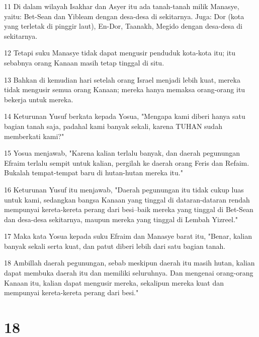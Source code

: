 \par 11 Di dalam wilayah Isakhar dan Asyer itu ada tanah-tanah milik Manasye, yaitu: Bet-Sean dan Yibleam dengan desa-desa di sekitarnya. Juga: Dor (kota yang terletak di pinggir laut), En-Dor, Taanakh, Megido dengan desa-desa di sekitarnya.
\par 12 Tetapi suku Manasye tidak dapat mengusir penduduk kota-kota itu; itu sebabnya orang Kanaan masih tetap tinggal di situ.
\par 13 Bahkan di kemudian hari setelah orang Israel menjadi lebih kuat, mereka tidak mengusir semua orang Kanaan; mereka hanya memaksa orang-orang itu bekerja untuk mereka.
\par 14 Keturunan Yusuf berkata kepada Yosua, "Mengapa kami diberi hanya satu bagian tanah saja, padahal kami banyak sekali, karena TUHAN sudah memberkati kami?"
\par 15 Yosua menjawab, "Karena kalian terlalu banyak, dan daerah pegunungan Efraim terlalu sempit untuk kalian, pergilah ke daerah orang Feris dan Refaim. Bukalah tempat-tempat baru di hutan-hutan mereka itu."
\par 16 Keturunan Yusuf itu menjawab, "Daerah pegunungan itu tidak cukup luas untuk kami, sedangkan bangsa Kanaan yang tinggal di dataran-dataran rendah mempunyai kereta-kereta perang dari besi--baik mereka yang tinggal di Bet-Sean dan desa-desa sekitarnya, maupun mereka yang tinggal di Lembah Yizreel."
\par 17 Maka kata Yosua kepada suku Efraim dan Manasye barat itu, "Benar, kalian banyak sekali serta kuat, dan patut diberi lebih dari satu bagian tanah.
\par 18 Ambillah daerah pegunungan, sebab meskipun daerah itu masih hutan, kalian dapat membuka daerah itu dan memiliki seluruhnya. Dan mengenai orang-orang Kanaan itu, kalian dapat mengusir mereka, sekalipun mereka kuat dan mempunyai kereta-kereta perang dari besi."

\chapter{18}

